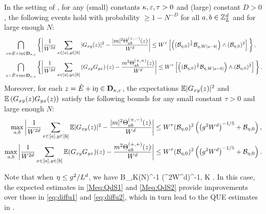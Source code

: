 \begin{theorem}\label{MR:QuDiff}
    In the setting of , for any (small) constants $\kappa,{\varepsilon}, \tau>0$ and (large) constant $D>0$, the following events hold with probability $\ge 1-N^{-D}$ for all $a,b\in {\mathbb Z}_L^d$ and for large enough $N$: 
    \begin{align}
    &\bigcap_{z=\hat{E}+\ii\eta\in \mathbf D_{\kappa,\e}}
    	\bigg\{\bigg|\frac{1}{W^{2d}}
    	\sum_{x\in[a],y\in[b]}|G_{xy}(z)|^2 - \frac{|m|^2\Theta_{ab}^{(+,-)}(z)}{W^d}\bigg| \le W^\tau \br{\p{(\mathcal B_{\eta,0})^{\frac 1 5} \mathcal B_{\eta,W|a-b|}}\wedge (\mathcal B_{\eta,0})^{2}}\bigg\}\, , %
    	\label{eq:diffu1}\\
    	&\bigcap_{z=\hat{E}+\ii\eta\in \mathbf D_{\kappa,\e}}
    	\bigg\{\bigg|\frac{1}{W^{2d}}
    \sum_{x\in[a],y\in[b]}\p{G_{xy}G_{yx}}(z) - \frac{m^2\Theta^{(+,+)}_{ab}(z)}{W^d} \bigg| \le W^\tau \br{\p{(\mathcal B_{\eta,0})^{\frac 1 5} \mathcal B_{\eta,W|a-b|}}\wedge (\mathcal B_{\eta,0})^{2}}\bigg\}\, %
    	\label{eq:diffu2}.
    \end{align}
Moreover, for each $z=\hat{E}+\mathrm{i}\eta\in \mathbf D_{\kappa,{\varepsilon}}$, the expectations $\mathbb{E}|G_{xy}(z)|^2$ and $\mathbb{E}\left({G_{xy}(z)G_{yx}(z)}\right)$ satisfy the following bounds for any small constant $\tau>0$ and large enough $N$: 
\begin{align}\label{Meq:QdS1}
 \max_{a,b }  \bigg|\frac{1}{W^{2d}}
    	\sum_{x\in[a],y\in[b]}\mathbb{E}|G_{xy}(z)|^2 - \frac{|m|^2\Theta_{ab}^{(+,-)}(z)}{W^d} \bigg| \le W^\tau (\mathcal B_{\eta,0})^{2} \left(\left({g^2W^{d}}\right)^{-1/ 5}+\mathcal B_{\eta,0}\right),   \\
 \label{Meq:QdS2}
 \max_{a,b }  \bigg|\frac{1}{W^{2d}}
    	\sum_{x\in[a],y\in[b]}\mathbb{E}(G_{xy}G_{yx})(z) - \frac{m^2\Theta_{ab}^{(+,+)}(z)}{W^d}\bigg|\le W^\tau (\mathcal B_{\eta,0})^{2} \left(\left({g^2W^{d}}\right)^{-1/ 5}+\mathcal B_{\eta,0}\right) .
\end{align}
\end{theorem}

Note that when $\eta \le g^{2}/L^{d}$, we have 
\be\label{eq:BetaK}
\cal B_{\eta,K}\asymp (N\eta)^{-1} \ge (\ilambda^2W^d)^{-1}, \quad \forall K .
\ee
In this case, the expected estimates in \eqref{Meq:QdS1} and \eqref{Meq:QdS2} provide improvements over those in \eqref{eq:diffu1} and \eqref{eq:diffu2}, which in turn lead to the QUE estimates in . 
 

